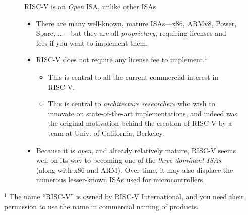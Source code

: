 \documentclass{article}
\begin{document}
\begin{figure}[htp]
    \centering
    {\Huge RISC-V is an \emph{Open} ISA, unlike other ISAs}

    \vspace{0.5in}

    \begin{minipage}{9in}\LARGE
      \begin{itemize}

        \item There are many well-known, mature ISAs---x86, ARMv8,
          Power, Sparc, ...---but they are all \emph{proprietary},
          requiring licenses and fees if you want to implement them.

        \item RISC-V does not require any license fee to
          implement.$^1$

          \begin{itemize}
          \item This is central to all the current commercial interest in RISC-V.
          \item This is central to \emph{architecture researchers} who
            wish to innovate on state-of-the-art implementations, and
            indeed was the original motivation behind the creation of
            RISC-V by a team at Univ. of California, Berkeley.
          \end{itemize}

        \item Because it is \emph{open}, and already relatively
          mature, RISC-V seems well on its way to becoming one of the
          \emph{three dominant ISAs} (along with x86 and ARM).  Over
          time, it may also displace the numerous lesser-known ISAs
          used for microcontrollers.

      \end{itemize}
    \end{minipage}
\end{figure}

\vfill

{$^1$ The name ``RISC-V'' is owned by RISC-V International, and you
  need their permission to use the name in commercial naming of
  products.}

\clearpage

\end{document}
